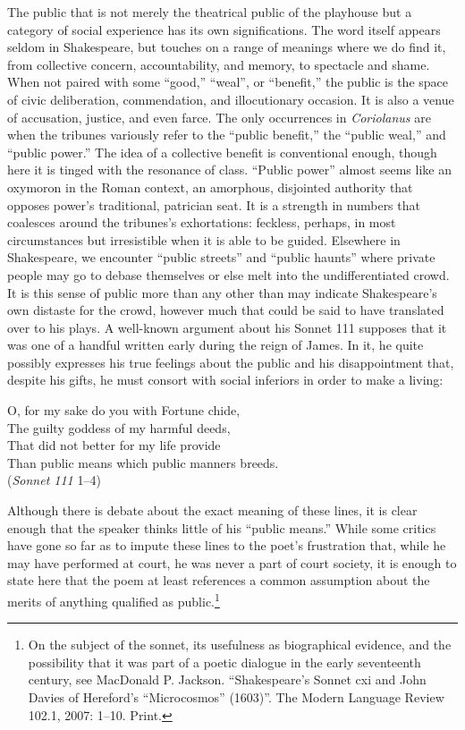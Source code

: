 The public that is not merely the theatrical public of the playhouse but a category of social experience has its own significations.
The word itself appears seldom in Shakespeare, but touches on a range of meanings where we do find it, from collective concern, accountability, and memory, to spectacle and shame.
When not paired with some ``good,'' ``weal'', or ``benefit,'' the public is the space of civic deliberation, commendation, and illocutionary occasion.
It is also a venue of accusation, justice, and even farce.
The only occurrences in \emph{Coriolanus} are when the tribunes variously refer to the ``public benefit,'' the ``public weal,'' and ``public power.''
The idea of a collective benefit is conventional enough, though here it is tinged with the resonance of class.
``Public power'' almost seems like an oxymoron in the Roman context, an amorphous, disjointed authority that opposes power's traditional, patrician seat.
It is a strength in numbers that coalesces around the tribunes's exhortations: feckless, perhaps, in most circumstances but irresistible when it is able to be guided.
Elsewhere in Shakespeare, we encounter ``public streets'' and ``public haunts'' where private people may go to debase themselves or else melt into the undifferentiated crowd.
It is this sense of public more than any other than may indicate Shakespeare's own distaste for the crowd, however much that could be said to have translated over to his plays.
A well-known argument about his Sonnet 111 supposes that it was one of a handful written early during the reign of James.
In it, he quite possibly expresses his true feelings about the public and his disappointment that, despite his gifts, he must consort with social inferiors in order to make a living:
\begin{vq}
O, for my sake do you with Fortune chide,\\
The guilty goddess of my harmful deeds,\\
That did not better for my life provide\\
Than public means which public manners breeds.\\
\hfill(\emph{Sonnet 111} 1--4)
\end{vq}
Although there is debate about the exact meaning of these lines, it is clear enough that the speaker thinks little of his ``public means.''
While some critics have gone so far as to impute these lines to the poet's frustration that, while he may have performed at court, he was never a part of court society, it is enough to state here that the poem at least references a common assumption about the merits of anything qualified as public.\footnote{On the subject of the sonnet, its usefulness as biographical evidence, and the possibility that it was part of a poetic dialogue in the early seventeenth century, see MacDonald P. Jackson. ``Shakespeare's Sonnet cxi and John Davies of Hereford's ``Microcosmos'' (1603)''. The Modern Language Review 102.1, 2007: 1--10. Print.\nocite{jackson_2007}}
